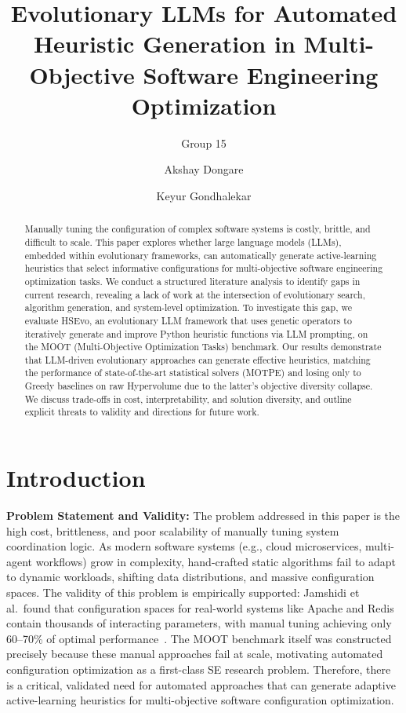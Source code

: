 \documentclass[sigconf,nonacm]{acmart}
\title{Evolutionary LLMs for Automated Heuristic Generation in Multi-Objective Software Engineering Optimization}
\subtitle{Group 15}
\author{Akshay Dongare}
\affiliation{
  \institution{North Carolina State University}
  \city{Raleigh}
  \state{NC}
  \country{USA}
}
\author{Keyur Gondhalekar}
\affiliation{
  \institution{North Carolina State University}
  \city{Raleigh}
  \state{NC}
  \country{USA}
}
\begin{document}
\begin{abstract}
Manually tuning the configuration of complex software systems is
costly, brittle, and difficult to scale. This paper explores whether
large language models (LLMs), embedded within evolutionary frameworks,
can automatically generate active-learning heuristics that select
informative configurations for multi-objective software engineering
optimization tasks. We conduct a structured literature analysis to identify gaps in current research, revealing a lack of work at the intersection of evolutionary search, algorithm generation, and system-level optimization. To investigate this gap, we evaluate HSEvo, an evolutionary LLM framework that uses genetic operators to iteratively generate and improve Python heuristic functions via LLM prompting, on the MOOT (Multi-Objective Optimization Tasks) benchmark. Our results demonstrate that LLM-driven evolutionary approaches can generate effective heuristics, matching the performance of state-of-the-art statistical solvers (MOTPE) and losing only to Greedy baselines on raw Hypervolume due to the latter's objective diversity collapse. We discuss trade-offs in cost, interpretability, and solution diversity, and outline explicit threats to validity and directions for future work.
\end{abstract}

\maketitle

\section{Introduction}

\textbf{Problem Statement and Validity:} The problem addressed in this paper is the high cost, brittleness, and poor scalability of manually tuning system coordination logic. As modern software systems (e.g., cloud microservices, multi-agent workflows) grow in complexity, hand-crafted static algorithms fail to adapt to dynamic workloads, shifting data distributions, and massive configuration spaces. The validity of this problem is empirically supported: Jamshidi et al.\ found that configuration spaces for real-world systems like Apache and Redis contain thousands of interacting parameters, with manual tuning achieving only 60--70\% of optimal performance~\cite{menzies2024moot}. The MOOT benchmark itself was constructed precisely because these manual approaches fail at scale, motivating automated configuration optimization as a first-class SE research problem. Therefore, there is a critical, validated need for automated approaches that can generate adaptive active-learning heuristics for multi-objective software configuration optimization.
\end{document}

